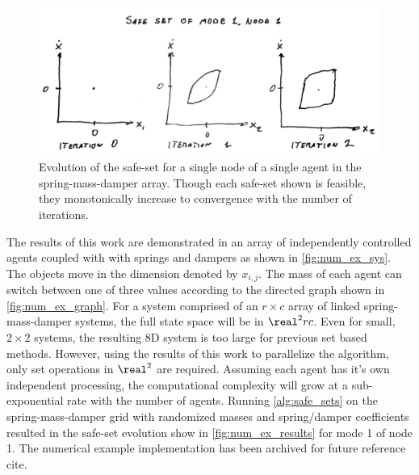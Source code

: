 \begin{figure}[t]
\centering
\includegraphics[width=\columnwidth]{./figures/num_ex_results}
\caption{Evolution of the safe-set for a single node of a single agent in the spring-mass-damper array. Though each safe-set shown is feasible, they monotonically increase to convergence with the number of iterations.}
\label{fig:num_ex_results}
\end{figure}

The results of this work are demonstrated in an array of independently controlled agents coupled with with springs and dampers as shown in \autoref{fig:num_ex_sys}. The objects move in the dimension denoted by $x_{i,j}$. The mass of each agent can switch between one of three values according to the directed graph shown in \autoref{fig:num_ex_graph}. For a system comprised of an $r\times c$ array of linked spring-mass-damper systems, the full state space will be in $\real^2rc$. Even for small, $2\times 2$ systems, the resulting 8D system is too large for previous set based methods. However, using the results of this work to parallelize the algorithm, only set operations in $\real^2$ are required. Assuming each agent has it's own independent processing, the computational complexity will grow at a sub-exponential rate with the number of agents. Running \autoref{alg:safe_sets} on the spring-mass-damper grid with randomized masses and spring/damper coefficients resulted in the safe-set evolution show in \autoref{fig:num_ex_results} for mode 1 of node 1. The numerical example implementation has been archived for future reference \alert{cite}. 